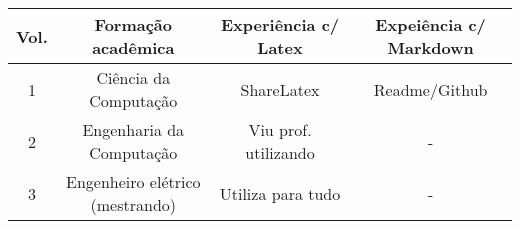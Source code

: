 \begin{longtable}[]{@{}cccc@{}}
\toprule
Vol. & Formação acadêmica & Experiência c/ Latex & Expeiência c/ Markdown\tabularnewline
\midrule
\endhead
1 & Ciência da Computação & ShareLatex & Readme/Github\tabularnewline
2 & Engenharia da Computação & Viu prof. utilizando & -\tabularnewline
3 & Engenheiro elétrico (mestrando) & Utiliza para tudo & -\tabularnewline
\bottomrule
\end{longtable}
